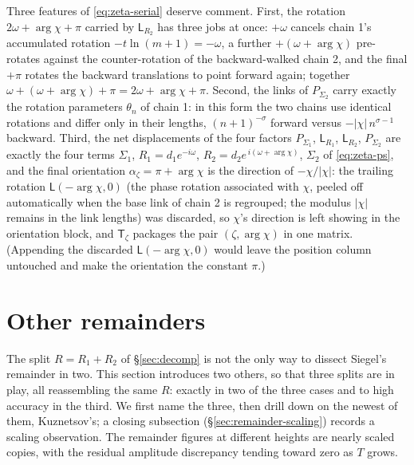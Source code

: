\documentclass[11pt]{article}
\theoremstyle{definition}
\begin{document}
Three features of \eqref{eq:zeta-serial}
deserve comment. First, the rotation $2\omega+\arg\chi+\pi$ carried by
$\mathsf L_{R_{2}}$ has three jobs at once: $+\omega$ cancels chain 1's
accumulated rotation $-t\ln(m+1)=-\omega$, a
further $+(\omega+\arg\chi)$ pre-rotates against the counter-rotation of
the backward-walked chain 2, and the final $+\pi$ rotates the backward
translations to point forward again; together
$\omega+(\omega+\arg\chi)+\pi=2\omega+\arg\chi+\pi$. Second, the links of
$P_{\Sigma_2}$ carry exactly the rotation parameters $\theta_n$ of chain 1:
in this form the two chains use identical rotations and differ only in
their lengths, $(n+1)^{-\sigma}$ forward versus $-|\chi|\,n^{\sigma-1}$
backward. Third, the net displacements of the four factors $P_{\Sigma_1}$,
$\mathsf L_{R_{1}}$, $\mathsf L_{R_{2}}$, $P_{\Sigma_2}$ are exactly the four terms
$\Sigma_1$, $R_{1}=d_1e^{-i\omega}$,
$R_{2}=d_2e^{\,i(\omega+\arg\chi)}$, $\Sigma_2$ of \eqref{eq:zeta-ps},
and the final orientation $\alpha_{\zeta}=\pi+\arg\chi$ is the direction of
$-\chi/|\chi|$: the trailing rotation $\mathsf L(-\arg\chi,0)$ (the phase
rotation associated with $\chi$, peeled off automatically when the base
link of chain 2 is regrouped; the modulus $|\chi|$ remains in the link
lengths) was discarded, so $\chi$'s direction is
left showing in the orientation block, and $\mathsf T_{\zeta}$ packages the pair
$(\zeta,\arg\chi)$ in one matrix. (Appending the discarded
$\mathsf L(-\arg\chi,0)$ would leave the position column untouched and make the
orientation the constant $\pi$.)

\section{Other remainders}\label{sec:other-remainders}

The split $R=R_{1}+R_{2}$ of \S\ref{sec:decomp} is not the only way to
dissect Siegel's remainder in two. This section introduces two others, so
that three splits are in play, all reassembling the same $R$: exactly in
two of the three cases and to high accuracy in the third. We first name
the three, then drill down on the newest of them, Kuznetsov's; a closing
subsection (\S\ref{sec:remainder-scaling}) records a scaling observation.
The remainder figures at different heights are nearly scaled copies, with
the residual amplitude discrepancy tending toward zero as $T$ grows.
\end{document}
